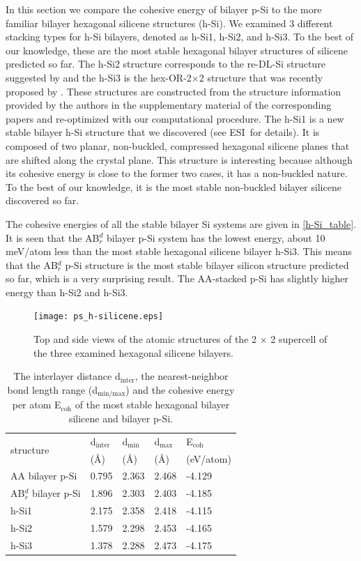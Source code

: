 In this section we compare the cohesive energy of bilayer p-Si to the more familiar bilayer hexagonal silicene structures (h-Si).  We examined 3 different stacking types for h-Si bilayers, denoted as h-Si1, h-Si2, and h-Si3. To the best of our knowledge, these are the most stable hexagonal bilayer structures of silicene predicted so far. The h-Si2 structure corresponds to the re-DL-Si structure suggested by \citet{Morishita2011} and the h-Si3 is the hex-OR-2$\times$2 structure that was recently proposed by \citet{Sakai2015}. These structures are constructed from the structure information provided by the authors in the supplementary material of the corresponding papers and re-optimized with our computational procedure. The h-Si1 is a new stable bilayer h-Si structure that we discovered (see ESI\dag~for details). It is composed of two planar, non-buckled, compressed hexagonal silicene planes that are shifted along the crystal plane. This structure is interesting because although its cohesive energy is close to the former two cases, it has a non-buckled nature. To the best of our knowledge, it is the most stable non-buckled bilayer silicene discovered so far. 

The cohesive energies of all the stable bilayer Si systems are given in \autoref{h-Si_table}. It is seen that the AB$_r^d$ bilayer p-Si system has the lowest energy, about 10 meV/atom less than the most stable hexagonal silicene bilayer h-Si3.  This means that the AB$_r^d$ p-Si structure is the most stable bilayer silicon structure predicted so far, which is a very surprising result. The AA-stacked p-Si has slightly higher energy than h-Si2 and h-Si3.


\begin{figure}[htbp]
\centering
\texttt{[image: ps\_h-silicene.eps]}%
\caption{Top and side views of the atomic structures of the 2 $\times$ 2 supercell of the three examined hexagonal silicene bilayers. \label{fig:ps_h-Si}}
\end{figure}

\begin{table}[htbp]
\centering
\caption{The interlayer distance d$_{\text{inter}}$, the nearest-neighbor bond length range (d$_{\text{min/max}}$) and the cohesive energy per atom E$_{\text{coh}}$ of the most stable hexagonal bilayer silicene and bilayer p-Si. }
\label{h-Si_table}
\begin{tabularx}{\linewidth}{lXXXX}
\hline
\multirow{2}{*}{structure}  &   d$_{\text{inter}}$ & d$_{\text{min}}$ & d$_{\text{max}}$ & E$_{\text{coh}}$  \\ 
 &   (\AA) & (\AA) & (\AA) &  (eV/atom) \\
 \hline
AA bilayer p-Si  &  0.795  & 2.363  & 2.468  & -4.129 \\
AB$_r^d$ bilayer p-Si  &  1.896  & 2.303  & 2.403  & -4.185 \\
h-Si1            &  2.175  & 2.358  & 2.418  & -4.115 \\
h-Si2            &  1.579  & 2.298  & 2.453  & -4.165 \\
h-Si3            &  1.378  & 2.288  & 2.473  & -4.175 \\ 
\hline
\end{tabularx}
\end{table}

